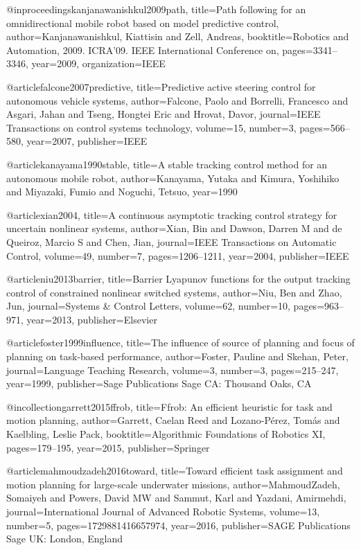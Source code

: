 @inproceedings{kanjanawanishkul2009path,
  title={Path following for an omnidirectional mobile robot based on model predictive control},
  author={Kanjanawanishkul, Kiattisin and Zell, Andreas},
  booktitle={Robotics and Automation, 2009. ICRA'09. IEEE International Conference on},
  pages={3341--3346},
  year={2009},
  organization={IEEE}
}

@article{falcone2007predictive,
  title={Predictive active steering control for autonomous vehicle systems},
  author={Falcone, Paolo and Borrelli, Francesco and Asgari, Jahan and Tseng, Hongtei Eric and Hrovat, Davor},
  journal={IEEE Transactions on control systems technology},
  volume={15},
  number={3},
  pages={566--580},
  year={2007},
  publisher={IEEE}
}

@article{kanayama1990stable,
  title={A stable tracking control method for an autonomous mobile robot},
  author={Kanayama, Yutaka and Kimura, Yoshihiko and Miyazaki, Fumio and Noguchi, Tetsuo},
  year={1990}
}

@article{xian2004,
  title={A continuous asymptotic tracking control strategy for uncertain nonlinear systems},
  author={Xian, Bin and Dawson, Darren M and de Queiroz, Marcio S and Chen, Jian},
  journal={IEEE Transactions on Automatic Control},
  volume={49},
  number={7},
  pages={1206--1211},
  year={2004},
  publisher={IEEE}
}

@article{niu2013barrier,
  title={Barrier Lyapunov functions for the output tracking control of constrained nonlinear switched systems},
  author={Niu, Ben and Zhao, Jun},
  journal={Systems \& Control Letters},
  volume={62},
  number={10},
  pages={963--971},
  year={2013},
  publisher={Elsevier}
}

@article{foster1999influence,
  title={The influence of source of planning and focus of planning on task-based performance},
  author={Foster, Pauline and Skehan, Peter},
  journal={Language Teaching Research},
  volume={3},
  number={3},
  pages={215--247},
  year={1999},
  publisher={Sage Publications Sage CA: Thousand Oaks, CA}
}


@incollection{garrett2015ffrob,
  title={Ffrob: An efficient heuristic for task and motion planning},
  author={Garrett, Caelan Reed and Lozano-P{\'e}rez, Tom{\'a}s and Kaelbling, Leslie Pack},
  booktitle={Algorithmic Foundations of Robotics XI},
  pages={179--195},
  year={2015},
  publisher={Springer}
}

@article{mahmoudzadeh2016toward,
  title={Toward efficient task assignment and motion planning for large-scale underwater missions},
  author={MahmoudZadeh, Somaiyeh and Powers, David MW and Sammut, Karl and Yazdani, Amirmehdi},
  journal={International Journal of Advanced Robotic Systems},
  volume={13},
  number={5},
  pages={1729881416657974},
  year={2016},
  publisher={SAGE Publications Sage UK: London, England}
}

